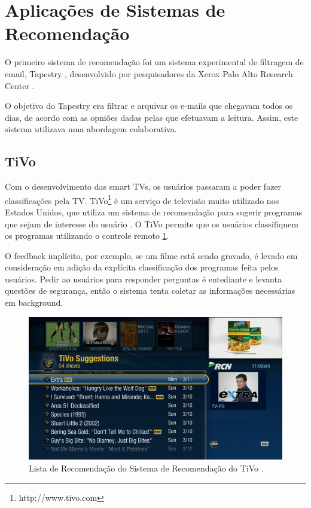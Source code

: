 \section{Aplicações de Sistemas de Recomendação}

O primeiro sistema de recomendação foi um sistema experimental de filtragem de email, Tapestry \citep{goldberg1992tapestry}, desenvolvido por pesquisadores da Xerox Palo Alto Research Center \citep{Resnick:1997:RS:245108.245121}.

O objetivo do Tapestry era filtrar e arquivar os e-mails que chegavam todos os dias, de acordo com as opniões dadas pelas que efetuavam a leitura. Assim, este sistema utilizava uma abordagem colaborativa.

\subsection{TiVo}

Com o desenvolvimento das smart TVs, os usuários passaram a poder fazer classificações pela TV. TiVo\footnote{http://www.tivo.com} é um serviço de televisão muito utilizado nos Estados Unidos, que utiliza um sistema de recomendação para sugerir programas que sejam de interesse do usuário \citep{Ali:2004:TMS:1014052.1014097}. O TiVo permite que os usuários classifiquem os programas utilizando o controle remoto \ref{fig:tivo_recomendacao}.

O feedback implícito, por exemplo, se um filme está sendo gravado, é levado em consideração em adição da explícita classificação dos programas feita pelos usuários. Pedir ao usuários para responder perguntas é entediante e levanta questões de segurança, então o sistema tenta coletar as informações necessárias em background.

\begin{figure}
	\centering
	\includegraphics[scale=0.65]{imagens/TiVo_suggestion.png}
	\caption{Lista de Recomendação do Sistema de Recomendação do TiVo \citep{TiVoSuggestion}.}
	\label{fig:tivo_recomendacao}
\end{figure} 

